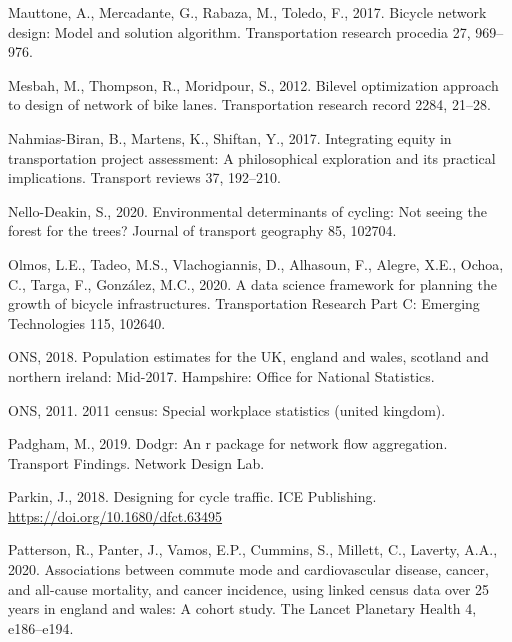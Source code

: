 \documentclass[
]{article}
\newlength{\cslhangindent}
\newlength{\cslentryspacingunit} %
\newenvironment{CSLReferences}[2] %
 {%
  \setlength{\parindent}{0pt}
  \ifodd #1
  \let\oldpar\par
  \def\par{\hangindent=\cslhangindent\oldpar}
  \fi
  \setlength{\parskip}{#2\cslentryspacingunit}
 }%
 {}
\begin{document}
\begin{CSLReferences}{1}{0}
\leavevmode{}%
Mauttone, A., Mercadante, G., Rabaza, M., Toledo, F., 2017. Bicycle network design: Model and solution algorithm. Transportation research procedia 27, 969--976.

\leavevmode{}%
Mesbah, M., Thompson, R., Moridpour, S., 2012. Bilevel optimization approach to design of network of bike lanes. Transportation research record 2284, 21--28.

\leavevmode{}%
Nahmias-Biran, B., Martens, K., Shiftan, Y., 2017. Integrating equity in transportation project assessment: A philosophical exploration and its practical implications. Transport reviews 37, 192--210.

\leavevmode{}%
Nello-Deakin, S., 2020. Environmental determinants of cycling: Not seeing the forest for the trees? Journal of transport geography 85, 102704.

\leavevmode{}%
Olmos, L.E., Tadeo, M.S., Vlachogiannis, D., Alhasoun, F., Alegre, X.E., Ochoa, C., Targa, F., González, M.C., 2020. A data science framework for planning the growth of bicycle infrastructures. Transportation Research Part C: Emerging Technologies 115, 102640.

\leavevmode{}%
ONS, 2018. Population estimates for the UK, england and wales, scotland and northern ireland: Mid-2017. Hampshire: Office for National Statistics.

\leavevmode{}%
ONS, 2011. 2011 census: Special workplace statistics (united kingdom).

\leavevmode{}%
Padgham, M., 2019. Dodgr: An r package for network flow aggregation. Transport Findings. Network Design Lab.

\leavevmode{}%
Parkin, J., 2018. Designing for cycle traffic. ICE Publishing. \url{https://doi.org/10.1680/dfct.63495}

\leavevmode{}%
Patterson, R., Panter, J., Vamos, E.P., Cummins, S., Millett, C., Laverty, A.A., 2020. Associations between commute mode and cardiovascular disease, cancer, and all-cause mortality, and cancer incidence, using linked census data over 25 years in england and wales: A cohort study. The Lancet Planetary Health 4, e186--e194.


\end{CSLReferences}
\end{document}
